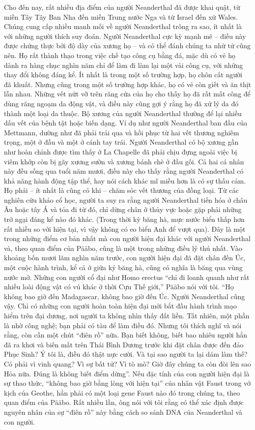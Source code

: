 \begin{multicols}{2}
	Cho đến nay, rất nhiều địa điểm của người Neanderthal đã được khai quật, từ miền Tây Tây Ban Nha đến miền Trung nước Nga và từ Israel đến xứ Wales. Chúng cung cấp nhiều manh mối về người Neanderthal trông ra sao, ít nhất là với những người thích suy đoán. Người Neanderthal cực kỳ mạnh mẽ -- điều này được chứng thực bởi độ dày của xương họ -- và có thể đánh chúng ta nhừ tử cũng nên. Họ rất thành thạo trong việc chế tạo công cụ bằng đá, mặc dù có vẻ họ dành ra hàng chục nghìn năm chỉ để làm đi làm lại một vài công cụ, với những thay đổi không đáng kể. Ít nhất là trong một số trường hợp, họ chôn cất người đã khuất. Nhưng cũng trong một số trường hợp khác, họ có vẻ còn giết và ăn thịt lẫn nhau. Những vết nứt vỡ trên răng cửa của họ cho thấy họ đã rất mất công để dùng răng ngoạm da động vật, và điều này cũng gợi ý rằng họ đã xử lý da đó thành một loại da thuộc. Bộ xương của người Neanderthal thường để lại nhiều dấu vết của bệnh tật hoặc biến dạng. Ví dụ như người Neanderthal ban đầu của Mettmann, dường như đã phải trải qua và hồi phục từ hai vết thương nghiêm trọng, một ở đầu và một ở cánh tay trái. Người Neanderthal có bộ xương gần như hoàn chỉnh được tìm thấy ở La Chapelle đã phải chịu đựng ngoài việc bị viêm khớp còn bị gãy xương sườn và xương bánh chè ở đầu gối. Cả hai cá nhân này đều sống qua tuổi năm mươi, điều này cho thấy rằng người Neanderthal có khả năng hành động tập thể, hay nói cách khác mĩ miều hơn là có sự thấu cảm. Họ phải -- ít nhất là cũng có khi -- chăm sóc vết thương của đồng loại.
	\vskip 0.1cm
	Từ các nghiên cứu khảo cổ học, người ta suy ra rằng người Neanderthal tiến hóa ở châu Âu hoặc tây Á và tỏa đi từ đó, chỉ dừng chân ở thủy vực hoặc gặp phải những trở ngại đáng kể nào đó khác. (Trong thời kỳ băng hà, mực nước biển thấp hơn rất nhiều so với hiện tại, vì vậy không có eo biển Anh để vượt qua). Đây là một trong những điểm cơ bản nhất mà con người hiện đại khác với người Neanderthal và, theo quan điểm của Pääbo, cũng là một trong những điều lý thú nhất. Vào khoảng bốn mươi lăm nghìn năm trước, con người hiện đại đã đặt chân đến Úc, một cuộc hành trình, kể cả ở giữa kỷ băng hà, cũng có nghĩa là băng qua vùng nước mở. Những con người cổ đại như Homo erectus “chỉ đi loanh quanh như rất nhiều loài động vật có vú khác ở thời Cựu Thế giới,” Pääbo nói với tôi. “Họ không bao giờ đến Madagascar, không bao giờ đến Úc. Người Neanderthal cũng vậy. Chỉ có những con người hoàn toàn hiện đại mới bắt đầu hành trình mạo hiểm trên đại dương, nơi người ta không nhìn thấy đất liền. Tất nhiên, một phần là nhờ công nghệ; bạn phải có tàu để làm điều đó. Nhưng tôi thích nghĩ và nói rằng, còn cần một chút “điên rồ” nữa. Bạn biết không, biết bao nhiêu người hẳn đã ra khơi và biến mất trên Thái Bình Dương trước khi đặt chân được đến đảo Phục Sinh? Ý tôi là, điều đó thật nực cười. Và tại sao người ta lại dám làm thế? Có phải vì vinh quang? Vì sự bất tử? Vì tò mò? Giờ đây chúng ta còn đòi lên sao Hỏa nữa. Đúng là không biết điểm dừng”. Nếu đặc tính của con người hiện đại là sự thao thức, “không bao giờ bằng lòng với hiện tại” của nhân vật Faust trong vở kịch của Geothe, hẳn phải có một loại gene Faust nào đó trong chúng ta, theo quan điểm của Pääbo. Rất nhiều lần, ông nói với tôi rằng có thể xác định được nguyên nhân của sự “điên rồ” này bằng cách so sánh DNA của Neanderthal và con người.

\end{multicols}

